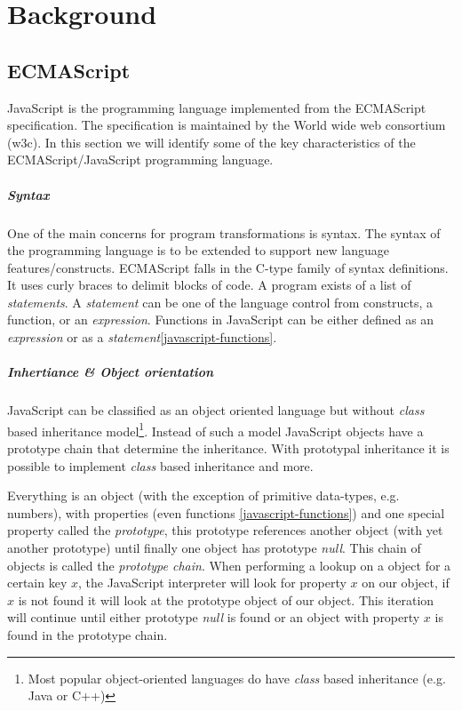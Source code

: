 
\chapter{Background} %

\label{Chapter2}


\section{ECMAScript}
JavaScript is the programming language implemented from the ECMAScript specification. The specification is maintained by the World wide web consortium (w3c). In this section we will identify some of the key characteristics of the ECMAScript/JavaScript programming language.

\paragraph{Syntax} \label{javascript-syntax}
One of the main concerns for program transformations is syntax. The syntax of the programming language is to be extended to support new language features/constructs. ECMAScript falls in the C-type family %
of syntax definitions. It uses curly braces to delimit blocks of code. 
A program exists of a list of \textit{statements}. A \textit{statement} can be one of the language control from constructs, a function, or an \textit{expression}. Functions in JavaScript can be either defined as an \textit{expression} or as a \textit{statement}\ref{javascript-functions}.

\paragraph{Inhertiance \& Object orientation} \label{javascript-inheritance}
JavaScript can be classified as an object oriented language but without \textit{class} based inheritance model\footnote{Most popular object-oriented languages do have \textit{class} based inheritance (e.g. Java or C++)}. Instead of such a model JavaScript objects have a prototype chain that determine the inheritance. With prototypal inheritance it is possible to implement \textit{class} based inheritance and more.

Everything is an object (with the exception of primitive data-types, e.g. numbers), with properties (even functions \ref{javascript-functions}) and one special property called the \textit{prototype}, this prototype references another object (with yet another prototype) until finally one object has prototype \textit{null}. This chain of objects is called the \textit{prototype chain}. When performing a lookup on a object for a certain key $x$, the JavaScript interpreter will look for property $x$ on our object, if $x$ is not found it will look at the prototype object of our object. This iteration will continue until either prototype \textit{null} is found or an object with property $x$ is found in the prototype chain. 

